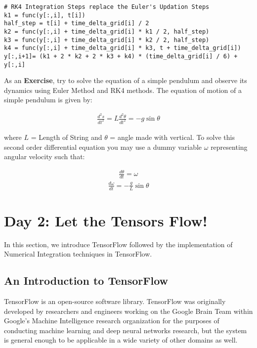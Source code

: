 \documentclass[10pt,letterpaper]{article}
\begin{document}
\begin{verbatim}
# RK4 Integration Steps replace the Euler's Updation Steps
k1 = func(y[:,i], t[i])                               
half_step = t[i] + time_delta_grid[i] / 2
k2 = func(y[:,i] + time_delta_grid[i] * k1 / 2, half_step)
k3 = func(y[:,i] + time_delta_grid[i] * k2 / 2, half_step)
k4 = func(y[:,i] + time_delta_grid[i] * k3, t + time_delta_grid[i])
y[:,i+1]= (k1 + 2 * k2 + 2 * k3 + k4) * (time_delta_grid[i] / 6) + y[:,i]
\end{verbatim}

As an \textbf{Exercise}, try to solve the equation of a simple pendulum and observe its dynamics using Euler Method and RK4 methods. The equation of motion of a simple pendulum is given by: 

\begin{eqnarray}\frac{d^2s}{dt^2}=L\frac{d^2\theta}{dt^2}=-g\sin{\theta}\end{eqnarray}

where $L$ = Length of String and $\theta$ = angle made with vertical. To solve this second order differential equation you may use a dummy variable $\omega$ representing angular velocity such that:

\begin{eqnarray}\frac{d\theta}{dt}=\omega \end{eqnarray}
\begin{eqnarray}\frac{d\omega}{dt}=-\frac{g}{L}\sin{\theta} \end{eqnarray}

\section*{Day 2: Let the Tensors Flow!}

In this section, we introduce TensorFlow followed by the implementation of Numerical Integration techniques in TensorFlow.

\subsection*{An Introduction to TensorFlow}

TensorFlow is an open-source software library. TensorFlow was originally developed by researchers and engineers working on the Google Brain Team within Google’s Machine Intelligence research organization for the purposes of conducting machine learning and deep neural networks research, but the system is general enough to be applicable in a wide variety of other domains as well.~\cite{}
\end{document}
